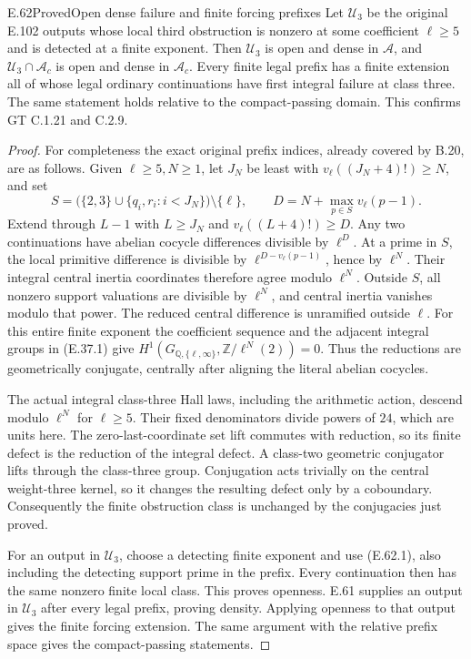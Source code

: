 \begin{result}{E.62}{Proved}{Open dense failure and finite forcing prefixes}
\label{coh:exact-open-three}
Let $\mathscr U_3$ be the original E.102
outputs whose local third obstruction is
nonzero at some coefficient $\ell\geq5$
and is detected at a finite exponent.
Then $\mathscr U_3$ is open and dense in
$\mathscr A$, and
$\mathscr U_3\cap\mathscr A_c$ is open
and dense in $\mathscr A_c$.
Every finite legal prefix has a finite
extension all of whose legal ordinary
continuations have first integral failure
at class three. The same statement holds
relative to the compact-passing domain.
This confirms GT C.1.21 and C.2.9.
\end{result}
\begin{proof}
For completeness the exact original
prefix indices, already covered by B.20,
are as follows. Given $\ell\geq5,N\geq1$,
let $J_N$ be least with
$v_\ell((J_N+4)!)\geq N$, and set
\[
 S=\bigl(\{2,3\}\cup
          \{q_i,r_i:i<J_N\}\bigr)\setminus\{\ell\},
 \qquad D=N+\max_{p\in S}v_\ell(p-1).
 \tag{E.62.1}
\]
Extend through $L-1$ with $L\geq J_N$ and
$v_\ell((L+4)!)\geq D$. Any two continuations
have abelian cocycle differences divisible
by $\ell^D$. At a prime in $S$, the
local primitive difference is divisible by
$\ell^{D-v_\ell(p-1)}$, hence by $\ell^N$.
Their integral central inertia coordinates
therefore agree modulo $\ell^N$.
Outside $S$, all nonzero support valuations
are divisible by $\ell^N$, and central
inertia vanishes modulo that power.
The reduced central difference is
unramified outside $\ell$.
For this entire finite exponent the
coefficient sequence and the adjacent
integral groups in (E.37.1) give
$H^1(G_{\mathbb Q,\{\ell,\infty\}},
\mathbb Z/\ell^N(2))=0$.
Thus the reductions are geometrically
conjugate, centrally after aligning the
literal abelian cocycles.

The actual integral class-three Hall laws,
including the arithmetic action, descend
modulo $\ell^N$ for $\ell\geq5$.
Their fixed denominators divide powers
of $24$, which are units here.
The zero-last-coordinate set lift commutes
with reduction, so its finite defect is
the reduction of the integral defect.
A class-two geometric conjugator lifts
through the class-three group. Conjugation
acts trivially on the central weight-three
kernel, so it changes the resulting
defect only by a coboundary.
Consequently the finite obstruction class
is unchanged by the conjugacies just proved.

For an output in $\mathscr U_3$, choose
a detecting finite exponent and use
(E.62.1), also including the detecting
support prime in the prefix. Every
continuation then has the same nonzero
finite local class. This proves openness.
E.61 supplies an output in $\mathscr U_3$
after every legal prefix, proving density.
Applying openness to that output gives
the finite forcing extension. The same
argument with the relative prefix space
gives the compact-passing statements.


\end{proof}
